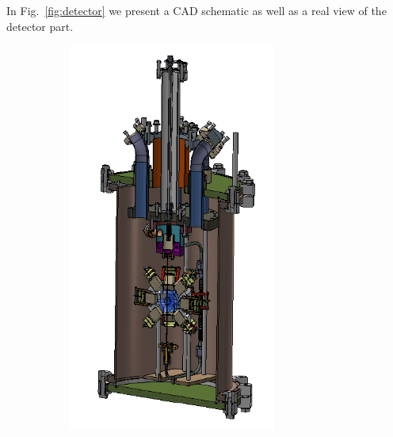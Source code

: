 In Fig.~\ref{fig:detector} we present a CAD schematic as well as a real view of the detector part.

\begin{figure}
	\centering
    \begin{subfigure}[b]{0.45\textwidth}
		\includegraphics[width=0.75\textwidth , height=0.3\textheight]{detCAD.png}%
	\end{subfigure}	
	\begin{subfigure}[b]{0.45\textwidth}

\end{subfigure}
\end{figure}
